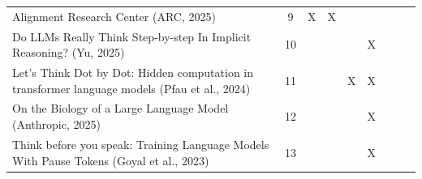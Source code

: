 \begin{landscape}
\begin{longtable}{|p{14cm}|c|c|c|c|c|c|c|c|}
		Alignment Research Center (ARC, 2025)                                                                            & 9           & X                                  & X                                                         &                                                       &                                                            &                                           &                                              &                                                    \\
		Do LLMs Really Think Step-by-step In Implicit Reasoning? (Yu, 2025)                                              & 10          &                                    &                                                           &                                                       & X                                                          &                                           &                                              &                                                    \\
		Let's Think Dot by Dot: Hidden computation in transformer language models (Pfau et al., 2024)                    & 11          &                                    &                                                           & X                                                     & X                                                          &                                           &                                              &                                                    \\
		On the Biology of a Large Language Model (Anthropic, 2025)                                                       & 12          &                                    &                                                           &                                                       & X                                                          &                                           &                                              &                                                    \\
		Think before you speak: Training Language Models With Pause Tokens (Goyal et al., 2023)                          & 13          &                                    &                                                           &                                                       & X                                                          &                                           &                                              &                                                    \\

\end{longtable}
\end{landscape}
